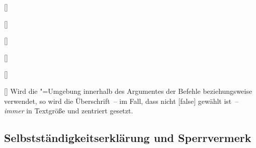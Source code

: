 \begin{Declaration}{[]}
\begin{Declaration}[v2.02]{}
\begin{Declaration}{[]}
\begin{Declaration}[v2.02]{%
  []%
}
\begin{Declaration}[v2.02]{%
  []%
}
\begin{Declaration}{[]}
\begin{Declaration}{[\PSet]}{%
}
Wird die "=Umgebung innerhalb des Argumentes der Befehle 
 beziehungsweise  verwendet, 
so wird die Überschrift~-- im Fall, dass nicht [false] gewählt 
ist~-- \emph{immer} in Textgröße und zentriert gesetzt.
\end{Declaration}
\end{Declaration}
\end{Declaration}
\end{Declaration}
\end{Declaration}
\end{Declaration}
\end{Declaration}
%


\subsection{Selbstständigkeitserklärung und Sperrvermerk}
